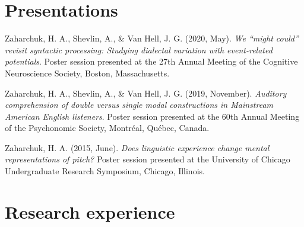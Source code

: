 \documentclass[11pt, a4paper]{awesome-cv}
\begin{document}
\hypertarget{presentations}{%
\section{Presentations}\label{presentations}}

\setlength{\parindent}{-0.2in}
\setlength{\leftskip}{0.2in}

\noindent

\hypertarget{refs_present}{}
\leavevmode\hypertarget{ref-3}{}%
Zaharchuk, H. A., Shevlin, A., \& Van Hell, J. G. (2020, May). \emph{We
{``might could''} revisit syntactic processing: Studying dialectal
variation with event-related potentials}. Poster session presented at
the {27th Annual Meeting of the Cognitive Neuroscience Society, Boston,
Massachusetts}.

\leavevmode\hypertarget{ref-2}{}%
Zaharchuk, H. A., Shevlin, A., \& Van Hell, J. G. (2019, November).
\emph{Auditory comprehension of double versus single modal constructions
in {M}ainstream {A}merican {E}nglish listeners}. Poster session
presented at the {60th Annual Meeting of the Psychonomic Society,
Montr{é}al, Qu{é}bec, Canada}.

\leavevmode\hypertarget{ref-1}{}%
Zaharchuk, H. A. (2015, June). \emph{Does linguistic experience change
mental representations of pitch?} Poster session presented at the
{University of Chicago Undergraduate Research Symposium, Chicago,
Illinois}.

\hypertarget{research-experience}{%
\section{Research experience}\label{research-experience}}

\begin{cventries}
\end{cventries}
\end{document}
